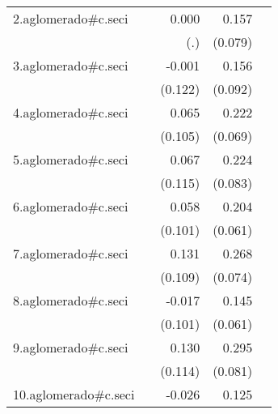 {\begin{longtable}{l*{4}{D{.}{.}{-1}}}
\addlinespace
2.aglomerado#c.seci&                     &       0.000         &       0.157\sym{*}  &                     \\
            &                     &         (.)         &     (0.079)         &                     \\
\addlinespace
3.aglomerado#c.seci&                     &      -0.001         &       0.156         &                     \\
            &                     &     (0.122)         &     (0.092)         &                     \\
\addlinespace
4.aglomerado#c.seci&                     &       0.065         &       0.222\sym{**} &                     \\
            &                     &     (0.105)         &     (0.069)         &                     \\
\addlinespace
5.aglomerado#c.seci&                     &       0.067         &       0.224\sym{**} &                     \\
            &                     &     (0.115)         &     (0.083)         &                     \\
\addlinespace
6.aglomerado#c.seci&                     &       0.058         &       0.204\sym{***}&                     \\
            &                     &     (0.101)         &     (0.061)         &                     \\
\addlinespace
7.aglomerado#c.seci&                     &       0.131         &       0.268\sym{***}&                     \\
            &                     &     (0.109)         &     (0.074)         &                     \\
\addlinespace
8.aglomerado#c.seci&                     &      -0.017         &       0.145\sym{*}  &                     \\
            &                     &     (0.101)         &     (0.061)         &                     \\
\addlinespace
9.aglomerado#c.seci&                     &       0.130         &       0.295\sym{***}&                     \\
            &                     &     (0.114)         &     (0.081)         &                     \\
\addlinespace
10.aglomerado#c.seci&                     &      -0.026         &       0.125\sym{*}  &                     \\

\end{longtable}}
